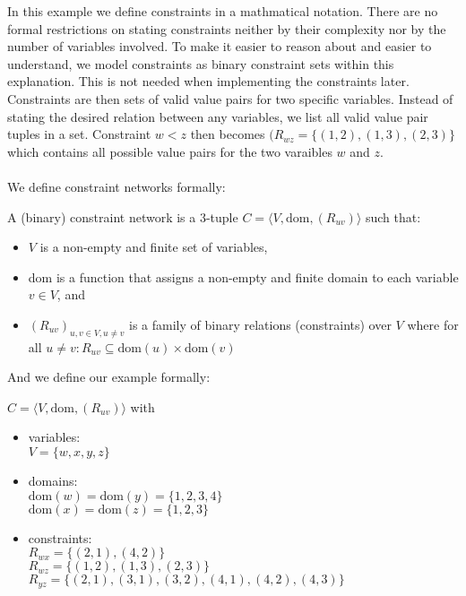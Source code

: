 In this example we define constraints in a mathmatical notation. There are no formal restrictions on stating constraints neither by their complexity nor by the number of variables involved. To make it easier to reason about and easier to understand, we model constraints as binary constraint sets within this explanation. This is not needed when implementing the constraints later. Constraints are then sets of valid value pairs for two specific variables. Instead of stating the desired relation between any variables, we list all valid value pair tuples in a set. Constraint $w < z$ then becomes $(R_{wz} = \{(1, 2), (1, 3), (2, 3)\}$ which contains all possible value pairs for the two varaibles $w$ and $z$. \\ \\

We define constraint networks formally:

\begin{tcolorbox}
	A (binary) constraint network is a 3-tuple $C = \langle V, \text{dom}, (R_{uv})\rangle$ such that:
	\begin{itemize}
		\item $V$ is a non-empty and finite set of variables,
		\item dom is a function that assigns a non-empty and finite domain to each variable $v \in V$, and
		\item $(R_{uv})_{u,v \in V, u \neq v}$ is a family of binary relations (constraints) over $V$ where for all $u \neq v: R_{uv} \subseteq \text{dom}(u) \times \text{dom}(v)$
	\end{itemize}
\end{tcolorbox}

And we define our example formally:

\begin{tcolorbox}
	$C = \langle V, \text{dom}, (R_{uv})\rangle$ with
	\begin{itemize}
		\item variables: \\
		      $V = \{w, x, y, z\}$
		\item domains: \\
		      $\text{dom}(w) = \text{dom}(y) = \{1, 2, 3, 4\}$ \\
		      $\text{dom}(x) = \text{dom}(z) = \{1, 2, 3\}$
		\item constraints: \\
		      $R_{wx} = \{(2, 1), (4, 2)\}$ \\
		      $R_{wz} = \{(1, 2), (1, 3), (2, 3)\}$ \\
		      $R_{yz} = \{(2, 1), (3, 1), (3, 2), (4, 1), (4, 2), (4, 3)\}$ \\
	\end{itemize}
\end{tcolorbox}

